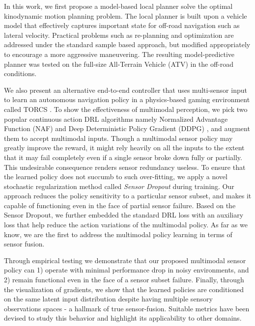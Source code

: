 \documentclass[../thesis.tex]{subfiles}
\begin{document}
In this work, we first propose a model-based local planner solve the optimal kinodynamic motion planning problem. 
The local planner is built upon a vehicle model that effectively captures important state for off-road navigation such as lateral velocity. 
Practical problems such as re-planning and optimization are addressed under the standard sample based approach, but modified appropriately to encourage a more aggressive maneuvering. 
The resulting model-predictive planner was tested on the full-size All-Terrain Vehicle (ATV) in the off-road conditions.

We also present an alternative end-to-end controller that uses multi-sensor input to learn an autonomous navigation policy in a physics-based gaming environment called TORCS \cite{wymann2000torcs}. 
To show the effectiveness of multimodal perception, we pick two popular continuous action DRL algorithms namely Normalized Advantage Function (NAF) \cite{CDQN} and Deep Deterministic Policy Gradient (DDPG) \cite{DBLP:journals/corr/LillicrapHPHETS15}, and augment them to accept multimodal inputs. 
Though a multimodal sensor policy may greatly improve the reward, it might rely heavily on all the inputs to the extent that it may fail completely even if a single sensor broke down fully or partially. This undesirable consequence renders sensor redundancy useless. 
To ensure that the learned policy does not succumb to such over-fitting, we apply a novel stochastic regularization method called \emph{Sensor Dropout} during training. 
Our approach reduces the policy sensitivity to a particular sensor subset, and makes it capable of functioning even in the face of partial sensor failure. 
Based on the Sensor Dropout, we further embedded the standard DRL loss with an auxiliary loss that help reduce the action variations of the multimodal policy. 
As far as we know, we are the first to address the multimodal policy learning in terms of sensor fusion.

Through empirical testing we demonstrate that our proposed multimodal sensor policy can 1) operate with minimal performance drop in noisy environments, and 2) remain functional even in the face of a sensor subset failure. 
Finally, through the visualization of gradients, we show that the learned policies are conditioned on the same latent input distribution despite having multiple sensory observations spaces - a hallmark of true sensor-fusion.
Suitable metrics have been devised to study this behavior and highlight its applicability to other domains.
\end{document}
